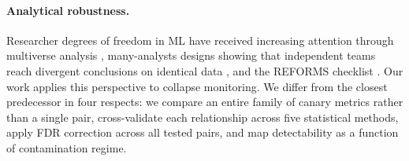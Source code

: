 \paragraph{Analytical robustness.}

Researcher degrees of freedom in ML have received increasing attention through multiverse analysis \cite{bell2022modeling}, many-analysts designs showing that independent teams reach divergent conclusions on identical data \cite{coretta2023multidimensional}, and the REFORMS checklist \cite{kapoor2024reforms}.
Our work applies this perspective to collapse monitoring.
We differ from the closest predecessor \cite{du2026geometric} in four respects: we compare an entire family of canary metrics rather than a single pair, cross-validate each relationship across five statistical methods, apply FDR correction across all tested pairs, and map detectability as a function of contamination regime.
